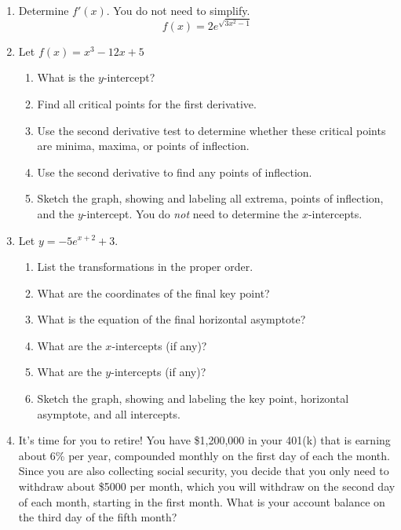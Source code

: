 \documentclass[letterpaper,12pt,fleqn]{article}
\begin{document}
\begin{enumerate}[left=0pt]

\item Determine \(f'(x)\).  You do not need to simplify.
  \[f(x)=2e^{\sqrt{3x^2-1}}\]

\item Let \(f(x)=x^3-12x+5\)
  \begin{enumerate}
  \item What is the \(y\)-intercept?
  \item Find all critical points for the first derivative.
  \item Use the second derivative test to determine whether these critical points are minima, maxima, or points of
    inflection.
  \item Use the second derivative to find any points of inflection.
  \item Sketch the graph, showing and labeling all extrema, points of inflection, and the \(y\)-intercept.  You do \emph{not}
    need to determine the \(x\)-intercepts.
  \end{enumerate}

\item Let \(y=-5e^{x+2}+3\).
  \begin{enumerate}
  \item List the transformations in the proper order.
  \item What are the coordinates of the final key point?
  \item What is the equation of the final horizontal asymptote?
  \item What are the \(x\)-intercepts (if any)?
  \item What are the \(y\)-intercepts (if any)?
  \item Sketch the graph, showing and labeling the key point, horizontal asymptote, and all intercepts.
  \end{enumerate}

\item It's time for you to retire!  You have \$1,200,000 in your 401(k) that is earning about 6\% per year, compounded monthly
  on the first day of each the month.  Since you are also collecting social security, you decide that you only need to withdraw
  about \$5000 per month, which you will withdraw on the second day of each month, starting in the first month.  What is your
  account balance on the third day of the fifth month?


\end{enumerate}
\end{document}
